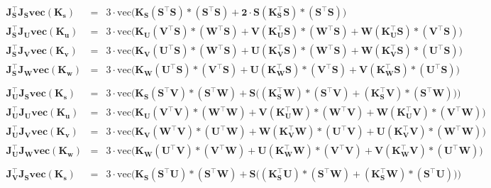     \newpage
    \begin{equation*}
        \begin{array}{ccc}
                \mathbf{J_S^\intercal J_S \text{vec}(K_s)} & = & \scriptstyle 3\cdot \text{vec}\bigl(\mathbf{K_S(S^\intercal S)\ast (S^\intercal S) + 2\cdot S(K_S^\intercal S)\ast (S^\intercal S)}\bigl) \\
                \mathbf{J_S^\intercal J_U \text{vec}(K_u)} & = & \scriptstyle 3\cdot \text{vec}\bigl(\mathbf{K_U(V^\intercal S)\ast (W^\intercal S) + V(K_U^\intercal S)\ast (W^\intercal S) + W(K_U^\intercal S)\ast (V^\intercal S)}\bigl) \\
                \mathbf{J_S^\intercal J_V \text{vec}(K_v)} & = & \scriptstyle 3\cdot \text{vec}\bigl(\mathbf{K_V(U^\intercal S)\ast (W^\intercal S) + U(K_V^\intercal S)\ast (W^\intercal S) + W(K_V^\intercal S)\ast (U^\intercal S)}\bigl) \\
                \mathbf{J_S^\intercal J_W \text{vec}(K_w)} & = & \scriptstyle 3\cdot \text{vec}\bigl(\mathbf{K_W(U^\intercal S)\ast (V^\intercal S) + U(K_W^\intercal S)\ast (V^\intercal S) + V(K_W^\intercal S)\ast (U^\intercal S)}\bigl) \\ \\
                \mathbf{J_U^\intercal J_S \text{vec}(K_s)} & = & \scriptstyle 3\cdot \text{vec}\bigl(\mathbf{K_S(S^\intercal V)\ast (S^\intercal W) + S\bigl((K_S^\intercal W)\ast (S^\intercal V) + (K_S^\intercal V)\ast (S^\intercal W)\bigl)}\bigl) \\
                \mathbf{J_U^\intercal J_U \text{vec}(K_u)} & = & \scriptstyle 3\cdot \text{vec}\bigl(\mathbf{K_U(V^\intercal V)\ast (W^\intercal W) + V(K_U^\intercal W)\ast (W^\intercal V) + W(K_U^\intercal V)\ast (V^\intercal W)}\bigl) \\
                \mathbf{J_U^\intercal J_V \text{vec}(K_v)} & = & \scriptstyle 3\cdot \text{vec}\bigl(\mathbf{K_V(W^\intercal V)\ast (U^\intercal W) + W(K_V^\intercal W)\ast (U^\intercal V) + U(K_V^\intercal V)\ast (W^\intercal W)}\bigl) \\
                \mathbf{J_U^\intercal J_W \text{vec}(K_w)} & = & \scriptstyle 3\cdot \text{vec}\bigl(\mathbf{K_W(U^\intercal V)\ast (V^\intercal W) + U(K_W^\intercal W)\ast (V^\intercal V) + V(K_W^\intercal V)\ast (U^\intercal W)}\bigl) \\ \\
                \mathbf{J_V^\intercal J_S \text{vec}(K_s)} & = & \scriptstyle 3\cdot \text{vec}\bigl(\mathbf{K_S(S^\intercal U)\ast (S^\intercal W) + S\bigl((K_S^\intercal U)\ast (S^\intercal W) + (K_S^\intercal W)\ast (S^\intercal U)\bigl)}\bigl) \\

\end{array}
\end{equation*}
